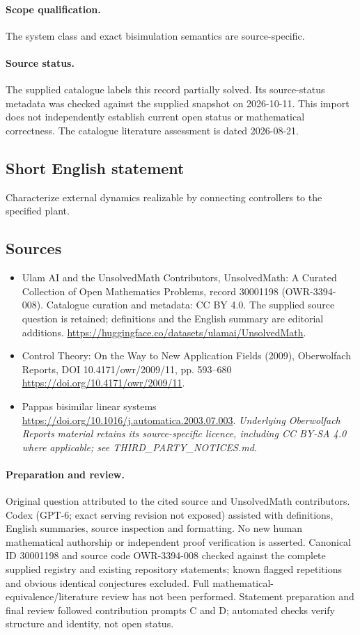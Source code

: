 \documentclass[11pt]{article}
\begin{document}
\paragraph{Scope qualification.}
The system class and exact bisimulation semantics are source-specific.
\paragraph{Source status.}
The supplied catalogue labels this record partially solved. Its source-status metadata was checked against the supplied snapshot on 2026-10-11. This import does not independently establish current open status or mathematical correctness. The catalogue literature assessment is dated 2026-08-21.
\subsection{Short English statement}
Characterize external dynamics realizable by connecting controllers to the specified plant.
\subsection{Sources}
\begin{itemize}
\item[S1] Ulam AI and the UnsolvedMath Contributors, UnsolvedMath: A Curated Collection of Open Mathematics Problems, record 30001198 (OWR-3394-008). Catalogue curation and metadata: CC BY 4.0. The supplied source question is retained; definitions and the English summary are editorial additions.
\url{https://huggingface.co/datasets/ulamai/UnsolvedMath}.
\item[S2] Control Theory: On the Way to New Application Fields (2009), Oberwolfach Reports, DOI 10.4171/owr/2009/11, pp. 593--680
\url{https://doi.org/10.4171/owr/2009/11}.
\item[S3] Pappas bisimilar linear systems
\url{https://doi.org/10.1016/j.automatica.2003.07.003}.
\textit{Underlying Oberwolfach Reports material retains its source-specific licence, including CC BY-SA 4.0 where applicable; see THIRD\_PARTY\_NOTICES.md.}
\end{itemize}
\paragraph{Preparation and review.}
Original question attributed to the cited source and UnsolvedMath contributors. Codex (GPT-6; exact serving revision not exposed) assisted with definitions, English summaries, source inspection and formatting. No new human mathematical authorship or independent proof verification is asserted. Canonical ID 30001198 and source code OWR-3394-008 checked against the complete supplied registry and existing repository statements; known flagged repetitions and obvious identical conjectures excluded. Full mathematical-equivalence/literature review has not been performed. Statement preparation and final review followed contribution prompts C and D; automated checks verify structure and identity, not open status.
\label{end:30001198}
\end{document}
